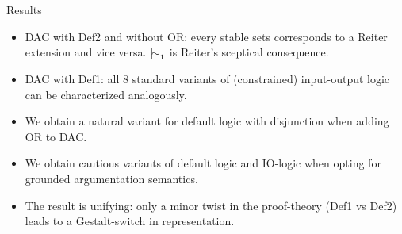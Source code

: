 \documentclass[aspectratio=169]{beamer}
\begin{document}
\begin{frame}[label={sec:org09f854e}]{Results}
\begin{itemize}
\item DAC with Def2 and without OR: every stable sets corresponds to a \alert{Reiter} extension and vice versa. \(\mathop{\mid\!\sim}_1\) is Reiter's sceptical consequence. \pause
\item DAC with Def1: all 8 standard variants of (constrained) \alert{input-output logic} can be characterized analogously. \pause
\item We obtain a natural variant for \alert{default logic} with disjunction when adding OR to DAC. \pause
\item We obtain \alert{cautious variants} of default logic and IO-logic when opting for grounded argumentation semantics. \pause
\item The result is \alert{unifying}: only a minor twist in the proof-theory (Def1 vs Def2) leads to a Gestalt-switch in representation.
\end{itemize}
\end{frame}
\end{document}
